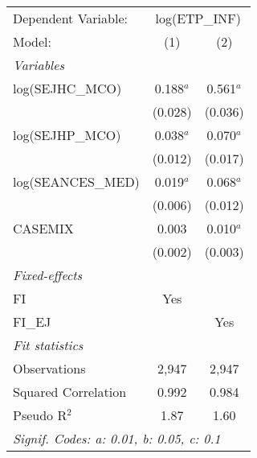 
\begingroup
\centering
\begin{tabular}{lcc}
   \tabularnewline \midrule \midrule
   Dependent Variable: & \multicolumn{2}{c}{log(ETP\_INF)}\\
   Model:              & (1)         & (2)\\  
   \midrule
   \emph{Variables}\\
   log(SEJHC\_MCO)     & 0.188$^{a}$ & 0.561$^{a}$\\   
                       & (0.028)     & (0.036)\\   
   log(SEJHP\_MCO)     & 0.038$^{a}$ & 0.070$^{a}$\\   
                       & (0.012)     & (0.017)\\   
   log(SEANCES\_MED)   & 0.019$^{a}$ & 0.068$^{a}$\\   
                       & (0.006)     & (0.012)\\   
   CASEMIX             & 0.003       & 0.010$^{a}$\\   
                       & (0.002)     & (0.003)\\   
   \midrule
   \emph{Fixed-effects}\\
   FI                  & Yes         & \\  
   FI\_EJ              &             & Yes\\  
   \midrule
   \emph{Fit statistics}\\
   Observations        & 2,947       & 2,947\\  
   Squared Correlation & 0.992       & 0.984\\  
   Pseudo R$^2$        & 1.87        & 1.60\\  
   \midrule \midrule
   \multicolumn{3}{l}{\emph{Signif. Codes: a: 0.01, b: 0.05, c: 0.1}}\\
\end{tabular}
\par\endgroup


